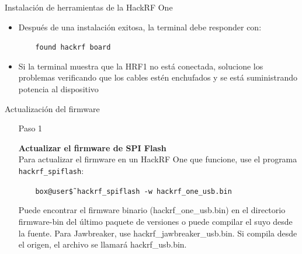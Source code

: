 \begin{frame}{Instalación de  herramientas de la HackRF One}

\begin{itemize}
    \item
    Después de una instalación exitosa, la terminal debe responder con: 

    \begin{block}{}
    \texttt{ ~~~found hackrf board}
    \end{block}
    \item
    {Si la terminal muestra que la HRF1 no está conectada, solucione los problemas verificando que los cables estén enchufados y se está suministrando potencia al dispositivo}
    
\end{itemize}
\end{frame}

\begin{frame}{Actualización del firmware}

\begin{itemize}
    \item [Paso 1]
    {\textbf {Actualizar el firmware de SPI Flash }\\ Para actualizar el firmware en un HackRF One que funcione, use el programa \texttt{hackrf\_spiflash}:
    
    \begin{block}{}
    \texttt{
    ~~~box@user\~\$ hackrf\_spiflash -w hackrf\_one\_usb.bin}
    \end{block}
    
    Puede encontrar el firmware binario (hackrf\_one\_usb.bin) en el directorio firmware-bin del último paquete de versiones o puede compilar el suyo desde la fuente. Para Jawbreaker, use hackrf\_jawbreaker\_usb.bin. Si compila desde el origen, el archivo se llamará hackrf\_usb.bin. 
    }
    
\end{itemize}
\end{frame}

